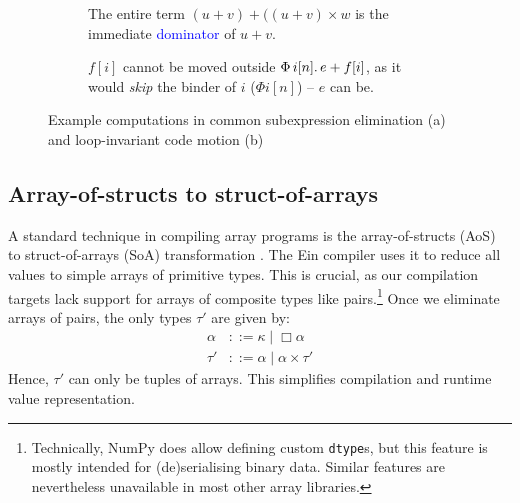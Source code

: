 \begin{figure}
\centering
\begin{subfigure}{.45\textwidth}
  \centering
{}
  \caption{The entire term $(u + v) + ((u + v) \times w$ is the immediate \textcolor{blue}{dominator} of $u + v$.}
\end{subfigure}%
\quad
\begin{subfigure}{.45\textwidth}
  \centering
{}
  \caption{$f[i]$ cannot be moved outside $\Phi\, {i}[{n}] \ldotp {e + f[i]}$, as it would \textit{skip} the binder of $i$ ($\Phi i[n]$) -- $e$ can be.}
\end{subfigure}
\caption{Example computations in common subexpression elimination (a) and loop-invariant code motion (b)}
\label{fig:transform-examples}
\end{figure}

\subsection{Array-of-structs to struct-of-arrays}
\label{aos-to-soa}

A standard technique in compiling array programs is the array-of-structs (AoS) to struct-of-arrays (SoA) transformation \cite{shaikhha2019efficient}. The Ein compiler uses it to reduce all values to simple arrays of primitive types. This is crucial, as our compilation targets lack support for arrays of composite types like pairs.\footnote{Technically, NumPy does allow defining custom \texttt{dtype}s, but this feature is mostly intended for (de)serialising binary data. Similar features are nevertheless unavailable in most other array libraries.}  Once we eliminate arrays of pairs, the only types $\tau'$ are given by:
\begin{align*}
\alpha &::= \kappa \mid \Box \alpha \\
\tau' &::= \alpha \mid \alpha \times \tau'
\end{align*}
Hence, $\tau'$ can only be tuples of arrays. This simplifies compilation and runtime value representation. 


